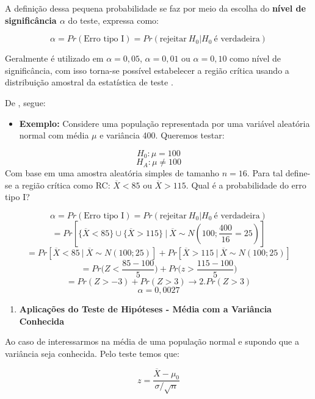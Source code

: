 \documentclass[
  openany]{book}
\providecommand{\tightlist}{%
  \setlength{\itemsep}{0pt}\setlength{\parskip}{0pt}}
\begin{document}
A definição dessa pequena probabilidade se faz por meio da escolha do \textbf{nível de significância \(\alpha\)} do teste, expressa como:

\begin{equation} 
 \alpha=Pr(\mbox{Erro tipo I})=Pr(\mbox{rejeitar} \ H_0|H_0 \ \mbox{é verdadeira})
  \label{eq:nivelsignificancia}
\end{equation}

Geralmente é utilizado em \(\alpha=0,05\), \(\alpha=0,01\) ou \(\alpha=0,10\) como nível de significância, com isso torna-se possível estabelecer a região crítica usando a distribuição amostral da estatística de teste \citep{fariaestatistic}.

De \citet{fariaestatistic}, segue:

\begin{itemize}
\tightlist
\item
  \textbf{Exemplo:} Considere uma população representada por uma variável aleatória normal com média \(\mu\) e variância 400. Queremos testar:
\end{itemize}

\[H_0:\mu = 100\]
\[H_A:\mu \neq 100\]
Com base em uma amostra aleatória simples de tamanho \(n=16\). Para tal define-se a região crítica como RC: \(\overline{X}<85\) ou \(\overline{X}>115\). Qual é a probabilidade do erro tipo I?

\[\alpha=Pr(\mbox{Erro tipo I})=Pr(\mbox{rejeitar} \ H_0|H_0 \ \mbox{é verdadeira})\]
\[=Pr[\{\overline{X}<85\} \cup \{\overline{X}>115\} \ | \ \overline{X}\sim N(100;\frac{400}{16}=25)]\]
\[=Pr[\overline{X}<85 \ | \  \overline{X}\sim N(100;25)]+Pr[\overline{X}>115 \ | \ \overline{X}\sim N(100;25)]\]
\[=Pr\bigg( Z<\frac{85-100}{5} \bigg)+Pr\bigg( z>\frac{115-100}{5} \bigg)\]
\[=Pr(Z>-3)+Pr(Z>3) \rightarrow 2.Pr(Z>3)\]
\[\alpha=0,0027\]

\begin{enumerate}
\def\labelenumi{\arabic{enumi}.}
\setcounter{enumi}{13}
\tightlist
\item
  \textbf{Aplicações do Teste de Hipóteses - Média com a Variância Conhecida}
\end{enumerate}

Ao caso de interessarmos na média de uma população normal e supondo que a variância seja conhecida. Pelo teste temos que:

\begin{equation} 
z=\frac{\overline{X}-\mu_0}{\sigma/\sqrt{n}}
  \label{eq:testehipmedia}
\end{equation}
\end{document}
